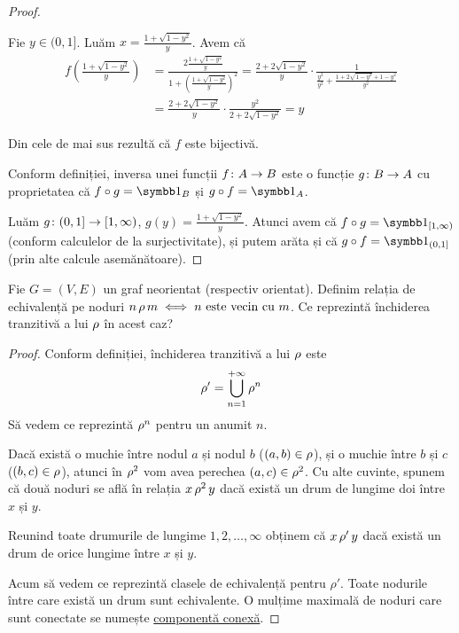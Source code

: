 \begin{proof}
\begin{itemize}
    Fie \(y \in (0, 1]\). Luăm \(x = \frac{1 + \sqrt{1 - y^2}}{y}\). Avem că
    \begin{align*}
        f\left(\frac{1 + \sqrt{1 - y^2}}{y}\right)
        &= \frac{2 \frac{1 + \sqrt{1 - y^2}}{y}}{1 + \left(\frac{1 + \sqrt{1 - y^2}}{y}\right)^2}
        = \frac{2 + 2\sqrt{1 - y^2}}{y} \cdot \frac{1}{\frac{y^2}{y^2} + \frac{1 + 2\sqrt{1 - y^2} + 1 - y^2}{y^2}} \\
        &= \frac{2 + 2\sqrt{1 - y^2}}{y} \cdot \frac{y^2}{2 + 2 \sqrt{1 - y^2}}
        = y
    \end{align*}
\end{itemize}
Din cele de mai sus rezultă că \(f\) este bijectivă.

Conform definiției, inversa unei funcții \(f \colon A \to B\) este o funcție \(g \colon B \to A\) cu proprietatea că \(f \circ g = \identity{B}\) și \(g \circ f = \identity{A}\).

Luăm \(g \colon (0, 1] \to [1, \infty)\), \(g(y) = \frac{1 + \sqrt{1 - y^2}}{y}\). Atunci avem că \(f \circ g = \identity{[1, \infty)}\) (conform calculelor de la surjectivitate), și putem arăta și că \(g \circ f = \identity{(0, 1]}\) (prin alte calcule asemănătoare).
\end{proof}

\begin{exercise}
Fie \(G = (V, E)\) un graf neorientat (respectiv orientat). Definim relația de echivalență pe noduri \(n \operatorname{\rho} m \iff n \text{ este vecin cu } m\). Ce reprezintă închiderea tranzitivă a lui \(\operatorname{\rho}\) în acest caz?
\end{exercise}
\begin{proof}
Conform definiției, închiderea tranzitivă a lui \(\operatorname{\rho}\) este
\[
    \operatorname{\rho}' = \bigcup_{n=1}^{+\infty} \operatorname{\rho}^n
\]
Să vedem ce reprezintă \(\operatorname{\rho}^n\) pentru un anumit \(n\).

Dacă există o muchie între nodul \(a\) și nodul \(b\) (\((a, b) \in \operatorname{\rho}\)), și o muchie între \(b\) și \(c\) (\((b, c) \in \operatorname{\rho}\)), atunci în \(\operatorname{\rho}^2\) vom avea perechea \((a, c) \in \operatorname{\rho}^2\).
Cu alte cuvinte, spunem că două noduri se află în relația \(x \operatorname{\rho}^2 y\) dacă există un drum de lungime doi între \(x\) și \(y\).

Reunind toate drumurile de lungime \(1, 2, \dots, \infty\) obținem că \(x \operatorname{\rho}' y\) dacă există un drum de orice lungime între \(x\) și \(y\).

Acum să vedem ce reprezintă clasele de echivalență pentru \(\rho'\). Toate nodurile între care există un drum sunt echivalente.
O mulțime maximală de noduri care sunt conectate se numește \href{https://en.wikipedia.org/wiki/Component_(graph_theory)}{componentă conexă}.
\end{proof}


